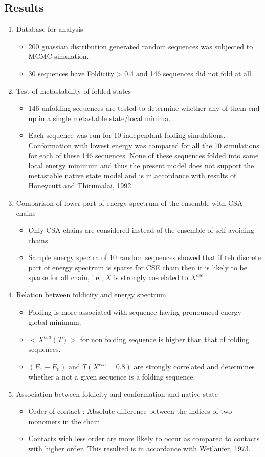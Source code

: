 \subsection{Results}
\begin{enumerate}
\item Database for analysis
	\begin{itemize}
	\item 200 guassian distribution generated random sequences was subjected to MCMC simulation.
	\item 30 sequences have Foldicity > 0.4 and 146 sequences did not fold at all.
	\end{itemize}
\item Test of metastability of folded states
	\begin{itemize}
	\item 146 unfolding sequences are tested to determine whether any of them end up in a single metastable state/local minima.
	\item Each sequence was run for 10 independant folding simulations. Conformation with lowest energy was compared for all the 10 simulations for each of these 146 sequences. None of these sequences folded into same local energy minimum and thus the present model does not support the metastable native state model and is in accordance with results of Honeycutt and Thirumalai, 1992.
	\end{itemize}
\item Comparison of lower part of energy spectrum of the ensemble with CSA chains
	\begin{itemize}
	\item Only CSA chains are considered instead of the ensemble of self-avoiding chains.
	\item Sample energy spectra of 10 random sequences showed that if teh discrete part of energy spectrum is sparse for CSE chain then it is likely to be sparse for all chain, i.e., $X$ is strongly co-related to $X^{cse}$
	\end{itemize}
\item Relation between foldicity and energy spectrum
	\begin{itemize}
	\item Folding is more associated with sequence having pronounced energy global minimum.
	\item $<X^{csa}(T)>$ for non folding sequence is higher than that of folding sequences.
	\item $(E_1 - E_0)$ and $T(X^{csa}=0.8)$ are strongly correlated and determines whether a not a given sequence is a folding sequence.
	\end{itemize}
\item Association between foldicity and conformation and native state
	\begin{itemize}
	\item Order of contact : Absolute difference between the indices of two monomers in the chain
	\item Contacts with less order are more likely to occur as compared to contacts with higher order. This resulted is in accordance with Wetlaufer, 1973.
	\end{itemize}
\end{enumerate}